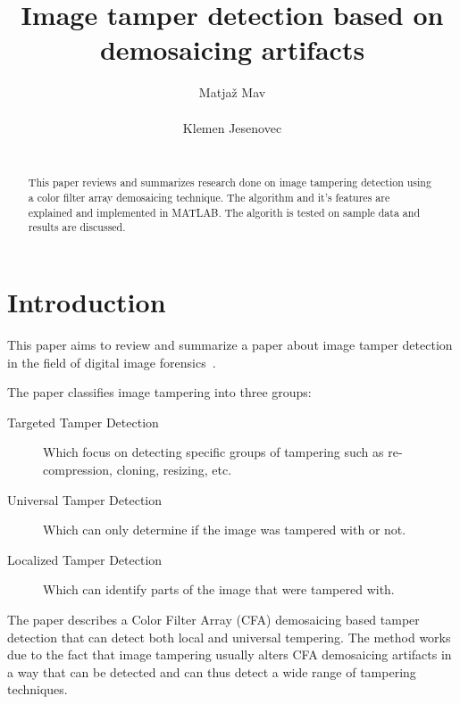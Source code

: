 \documentclass{template/acm_proc_article-sp}
\begin{document}
 

\title{Image tamper detection based on demosaicing artifacts}

\author{
\alignauthor
Matjaž Mav\\
       \\
\alignauthor
Klemen Jesenovec\\
       \\
}

\maketitle
\begin{abstract}
This paper reviews and summarizes research done on image tampering detection
using a color filter array demosaicing technique. The algorithm and it's features are
explained and implemented in MATLAB. The algorith is tested on sample data and results
are discussed.
\end{abstract}


\section{Introduction}
This paper aims to review and summarize a paper about image tamper 
detection in the field of digital image forensics~\cite{dirik2009image}.

The paper classifies image tampering into three groups: 
\begin{description}
    \item[Targeted Tamper Detection] Which focus on detecting specific groups of 
    tampering such as re-compression, cloning, resizing, etc. 
    \item[Universal Tamper Detection] Which can only determine if the image
    was tampered with or not.
    \item[Localized Tamper Detection] Which can identify parts of the image 
    that were tampered with.
\end{description}

The paper describes a Color Filter Array (CFA) demosaicing based tamper detection
that can detect both local and universal tempering.
The method works due to the fact that image tampering usually alters CFA demosaicing
artifacts in a way that can be detected and can thus detect a wide range of tampering
techniques. 
\end{document}
